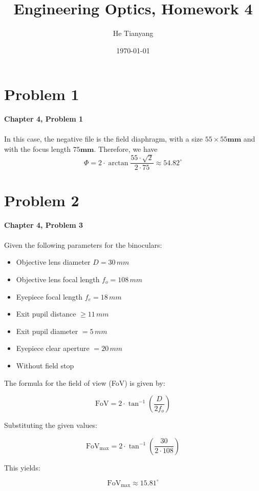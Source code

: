 \documentclass{article}
\title{Engineering Optics, Homework 4}
\author{He Tianyang}
\date{\today}
\begin{document}
\maketitle

\section{Problem 1}
\textbf{Chapter 4, Problem 1}\\\\

In this case, the negative file is the field diaphragm, with a size $55\times 55\textbf{mm}$
and with the focus length $75\textbf{mm}$.
Therefore, we have
\begin{equation}
    \boxed{
        \Phi = 2\cdot \arctan{\frac{55\cdot \sqrt{2}}{2\cdot 75}} \approx 54.82^{\circ}
    }
\end{equation}

\section{Problem 2}
\textbf{Chapter 4, Problem 3}\\\\

Given the following parameters for the binoculars:

\begin{itemize}
    \item Objective lens diameter \(D = 30\,mm\)
    \item Objective lens focal length \(f_o = 108\,mm\)
    \item Eyepiece focal length \(f_e = 18\,mm\)
    \item Exit pupil distance \(\geq 11\,mm\)
    \item Exit pupil diameter \(= 5\,mm\)
    \item Eyepiece clear aperture \(= 20\,mm\)
    \item Without field stop 
\end{itemize}


The formula for the field of view (FoV) is given by:

\[
\text{FoV} = 2 \cdot \tan^{-1}\left(\frac{D}{2f_{o}}\right)
\]

Substituting the given values:

\[
\text{FoV}_{\text{max}} = 2 \cdot \tan^{-1}\left(\frac{30}{2 \cdot 108}\right)
\]

This yields:

\[
\boxed{\text{FoV}_{\text{max}} \approx 15.81^\circ}
\]
\end{document}
